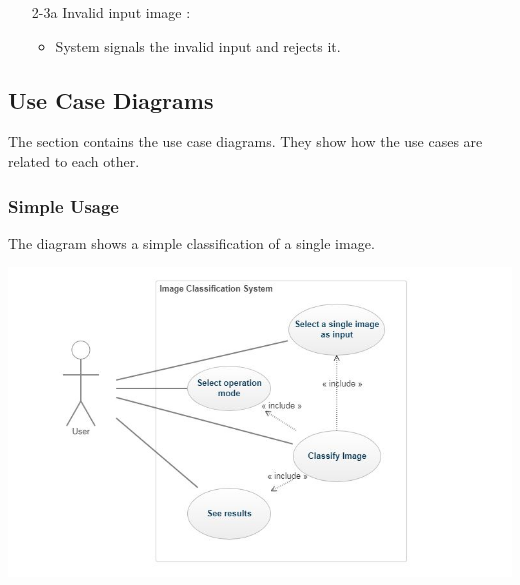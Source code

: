 \documentclass[parskip=full]{scrartcl}
\begin{document}
\begin{enumerate}
\begin{itemize} [nosep]
		\begin{itemize} [nosep]
			\item[1.] System signals error to the user, restarts, records the error, and enters a clean state.
			\item[2.] System loads in input images and restarts classification.
		\end{itemize}
		\item[2-3a] Invalid input image :
		\begin{itemize} [nosep]
			\item System signals the invalid input and rejects it.
		\end{itemize}
	\end{itemize}
\end{enumerate}



\subsection {Use Case Diagrams}

The section contains the use case diagrams. They show how the use cases are related to each other.

\subsubsection {Simple Usage}

The diagram shows a simple classification of a single image. 

\begin{center}
\includegraphics[width=1.0\textwidth]{UseCases/NormalUsageUCD.JPG}
\end{center}

\pagebreak
\end{document}
